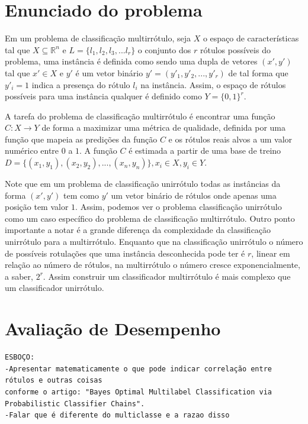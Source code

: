 \section{Enunciado do problema}

Em um problema de classificação multirrótulo, seja $X$ o espaço de características tal que
$X\subseteq \mathbb{R}^n$ e $L=\{l_1,l_2,l_3,...l_r\}$ o conjunto dos $r$ rótulos possíveis do problema,
uma instância é definida como sendo uma dupla de vetores $(x',y')$ tal que $x'\in X$ e $y'$ é um vetor binário
$y'=(y'_1,y'_2,...,y'_r)$ de tal forma que $y'_i=1$ indica a presença do rótulo $l_i$ na instância.
Assim, o espaço de rótulos possíveis para uma instância qualquer é definido como $Y=\{0,1\}^r$.



A tarefa do problema de classificação multirrótulo é encontrar uma função $C : X \rightarrow Y$ de forma
a maximizar uma métrica de qualidade, definida por uma função que mapeia as predições da função $C$
e os rótulos reais alvos a um valor numérico entre $0$ a $1$.
A função $C$ é estimada a partir de uma base de treino $D=\{(x_1,y_1),(x_2,y_2),...,(x_n,y_n)\}, x_i\in X, y_i\in Y$.

Note que em um problema de classificação unirrótulo todas as instâncias da forma $(x',y')$ tem como $y'$
um vetor binário de rótulos onde apenas uma posição tem valor $1$. Assim, podemos ver o problema classificação
unirrótulo como um caso específico do problema de classificação multirrótulo.
Outro ponto importante a notar é a grande diferença da complexidade da classificação unirrótulo para a multirrótulo.
Enquanto que na classificação unirrótulo o número de possíveis rotulações que uma instância desconhecida pode ter é
$r$, linear em relação ao número de rótulos, na multirrótulo o número cresce exponencialmente, a saber, $2^r$.
Assim construir um classificador multirrótulo é mais complexo que um classificador unirrótulo.



\section{Avaliação de Desempenho}
\begin{verbatim}
ESBOÇO:
-Apresentar matematicamente o que pode indicar correlação entre rótulos e outras coisas
conforme o artigo: "Bayes Optimal Multilabel Classification via Probabilistic Classifier Chains".
-Falar que é diferente do multiclasse e a razao disso
\end{verbatim}

